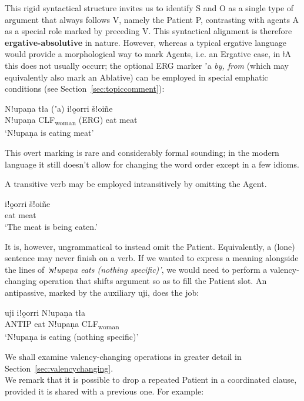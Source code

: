 \documentclass[11pt,a5paper]{book}
\newcommand{\qcn}[1]{\textcolor{AccentText}{\large#1}}
\newcommand{\langname}{\qcn{ǂA}}
\newcommand{\transl}[2]{\qcn{#1} \emph{#2}}
\newcommand{\grammsc}[1]{\textsc{#1}}
\newcommand{\CLF}[1]{\grammsc{CLF}\textsubscript{#1}}
\newcommand{\ERG}{\grammsc{ERG}}
\begin{document}
This rigid syntactical structure invites us to identify S and O as a single type of argument that always follows V, namely the Patient P, contrasting with agents A as a special role marked by preceding V. This syntactical alignment is therefore \textbf{ergative-absolutive} in nature. However, whereas a typical ergative language would provide a morphological way to mark Agents, i.e. an Ergative case, in \langname{} this does not usually occurr; the optional \ERG{} marker \transl{ʼa}{by, from} (which may equivalently also mark an Ablative) can be employed in special emphatic conditions (see Section~\ref{sec:topiccomment}):

\begin{exe}
	\ex
	\gll Nǃupaṇa 	tła  (ʼa)	iǃo̰orri  	šǃoiñe \\
		Nǃupaṇa 	\CLF{woman} (\ERG) 	eat 	meat\\
	\glt `Nǃupaṇa is eating meat'
\end{exe}

This overt marking is rare and considerably formal sounding; in the modern language it still doesn't allow for changing the word order except in a few idioms.

A transitive verb may be employed intransitively by omitting the Agent.

\begin{exe}
	\ex
	\gll iǃo̰orri 	šǃoiñe\\
eat 	meat\\
\glt `The meat is being eaten.'
\end{exe}

It is, however, ungrammatical to instead omit the Patient. Equivalently, a (lone) sentence may never finish on a verb. If we wanted to express a meaning alongside the lines of \emph{`ɴǃupaṇa eats (nothing specific)'}, we would need to perform a valency-changing operation that shifts argument so as to fill the Patient slot. An antipassive, marked by the auxiliary \qcn{uji}, does the job:

\begin{exe}
	\ex
	\gll  uji 	iǃo̰orri Nǃupaṇa 	tła  \\
	ANTIP eat	Nǃupaṇa 	\CLF{woman} 	\\
	\glt `Nǃupaṇa is eating (nothing specific)'
\end{exe}

We shall examine valency-changing operations in greater detail in Section~\ref{sec:valencychanging}.\\

We remark that it is possible to drop a repeated Patient in a coordinated clause, provided it is shared with a previous one. For example:
\end{document}
